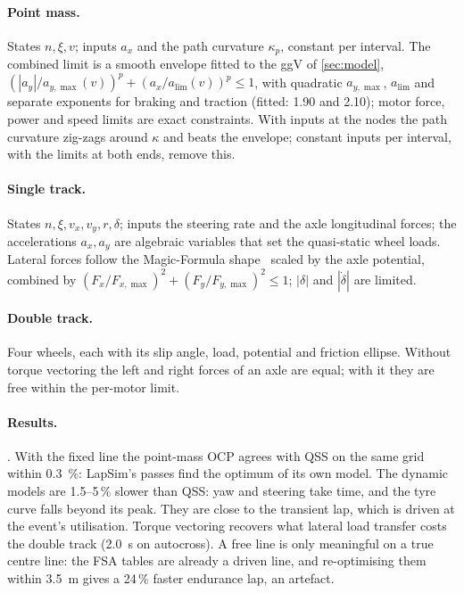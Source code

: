 \documentclass[11pt]{article}
\begin{document}
\paragraph{Point mass.} States $n,\xi,v$; inputs $a_x$ and the path curvature $\kappa_p$, constant per interval.
The combined limit is a smooth envelope fitted to the ggV of \cref{sec:model},
$(|a_y|/a_{y,\max}(v))^{p}+(a_x/a_{\lim}(v))^{p}\le1$, with quadratic $a_{y,\max}$, $a_{\lim}$ and separate exponents
for braking and traction (fitted: 1.90 and 2.10); motor force, power and speed limits are exact constraints. With
inputs at the nodes the path curvature zig-zags around $\kappa$ and beats the envelope; constant inputs per
interval, with the limits at both ends, remove this.

\paragraph{Single track.} States $n,\xi,v_x,v_y,r,\delta$; inputs the steering rate and the axle longitudinal
forces; the accelerations $a_x,a_y$ are algebraic variables that set the quasi-static wheel loads. Lateral forces
follow the Magic-Formula shape~\cite{pacejka2012} scaled by the axle potential, combined by
$(F_x/F_{x,\max})^2+(F_y/F_{y,\max})^2\le1$; $|\delta|$ and $|\dot\delta|$ are limited.

\paragraph{Double track.} Four wheels, each with its slip angle, load, potential and friction ellipse. Without torque
vectoring the left and right forces of an axle are equal; with it they are free within the per-motor limit.

\paragraph{Results.} . With the fixed line the point-mass OCP agrees with QSS on the same grid
within \SI{0.3}{\%}: LapSim's passes find the optimum of its own model. The dynamic models are 1.5--5\,\% slower than
QSS: yaw and steering take time, and the tyre curve falls beyond its peak. They are close to the transient lap,
which is driven at the event's utilisation. Torque vectoring recovers what lateral load transfer costs the double
track (\SI{2.0}{s} on autocross). A free line is only meaningful on a true centre line: the FSA tables are already a
driven line, and re-optimising them within \SI{3.5}{m} gives a 24\,\% faster endurance lap, an artefact.
\end{document}
